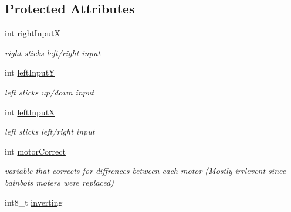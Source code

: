 \subsection*{Protected Attributes}
\begin{DoxyCompactItemize}
\item 
\mbox{\label{class_new_omni_drive_aa2f01ecabdb5766da6a691f26a6fe5be}} 
int \mbox{\hyperlink{class_new_omni_drive_aa2f01ecabdb5766da6a691f26a6fe5be}{right\+InputX}}
\begin{DoxyCompactList}\small\item\em right stick\textquotesingle{}s left/right input \end{DoxyCompactList}\item 
\mbox{\label{class_new_omni_drive_ab1710989ddfe9884e17ed2423c2d9073}} 
int \mbox{\hyperlink{class_new_omni_drive_ab1710989ddfe9884e17ed2423c2d9073}{left\+InputY}}
\begin{DoxyCompactList}\small\item\em left stick\textquotesingle{}s up/down input \end{DoxyCompactList}\item 
\mbox{\label{class_new_omni_drive_a83c8d2a3e3ab81400c25da275401d2cd}} 
int \mbox{\hyperlink{class_new_omni_drive_a83c8d2a3e3ab81400c25da275401d2cd}{left\+InputX}}
\begin{DoxyCompactList}\small\item\em left stick\textquotesingle{}s left/right input \end{DoxyCompactList}\item 
\mbox{\label{class_new_omni_drive_a5b93d59164f3c82569c1b867e0c1eaf8}} 
int \mbox{\hyperlink{class_new_omni_drive_a5b93d59164f3c82569c1b867e0c1eaf8}{motor\+Correct}}
\begin{DoxyCompactList}\small\item\em variable that corrects for diffrences between each motor (Mostly irrlevent since bainbots moters were replaced) \end{DoxyCompactList}\item 
\mbox{\label{class_new_omni_drive_a5d1e00b5f6eae8774c31373db65a8b0a}} 
int8\+\_\+t \mbox{\hyperlink{class_new_omni_drive_a5d1e00b5f6eae8774c31373db65a8b0a}{inverting}}

\end{DoxyCompactItemize}
